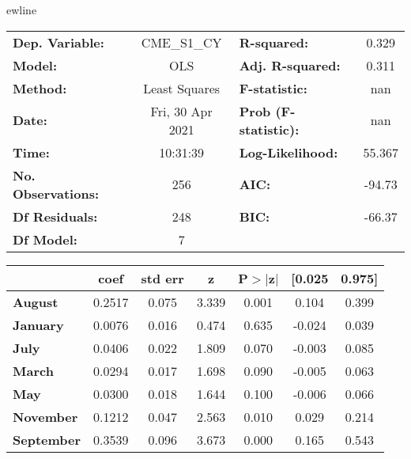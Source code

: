 ewline\begin{center}
\begin{tabular}{lclc}
\toprule
\textbf{Dep. Variable:}    &   CME\_S1\_CY    & \textbf{  R-squared:         } &     0.329   \\
\textbf{Model:}            &       OLS        & \textbf{  Adj. R-squared:    } &     0.311   \\
\textbf{Method:}           &  Least Squares   & \textbf{  F-statistic:       } &       nan   \\
\textbf{Date:}             & Fri, 30 Apr 2021 & \textbf{  Prob (F-statistic):} &      nan    \\
\textbf{Time:}             &     10:31:39     & \textbf{  Log-Likelihood:    } &    55.367   \\
\textbf{No. Observations:} &         256      & \textbf{  AIC:               } &    -94.73   \\
\textbf{Df Residuals:}     &         248      & \textbf{  BIC:               } &    -66.37   \\
\textbf{Df Model:}         &           7      & \textbf{                     } &             \\
\bottomrule
\end{tabular}
\begin{tabular}{lcccccc}
                   & \textbf{coef} & \textbf{std err} & \textbf{z} & \textbf{P$> |$z$|$} & \textbf{[0.025} & \textbf{0.975]}  \\
\midrule
\textbf{August}    &       0.2517  &        0.075     &     3.339  &         0.001        &        0.104    &        0.399     \\
\textbf{January}   &       0.0076  &        0.016     &     0.474  &         0.635        &       -0.024    &        0.039     \\
\textbf{July}      &       0.0406  &        0.022     &     1.809  &         0.070        &       -0.003    &        0.085     \\
\textbf{March}     &       0.0294  &        0.017     &     1.698  &         0.090        &       -0.005    &        0.063     \\
\textbf{May}       &       0.0300  &        0.018     &     1.644  &         0.100        &       -0.006    &        0.066     \\
\textbf{November}  &       0.1212  &        0.047     &     2.563  &         0.010        &        0.029    &        0.214     \\
\textbf{September} &       0.3539  &        0.096     &     3.673  &         0.000        &        0.165    &        0.543     \\

\end{tabular}
\end{center}
